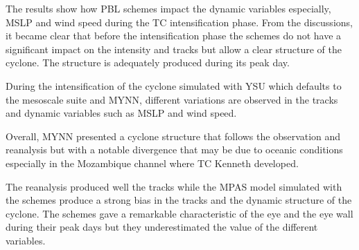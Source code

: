 \documentclass[8pt,a4paper]{article}
\begin{document}
	The results show how PBL schemes impact the dynamic variables especially, MSLP and wind speed during the TC intensification phase. From the discussions, it became clear that before the intensification phase the schemes do not have a significant impact on the intensity and tracks but allow a clear structure of the cyclone. The structure is adequately produced during its peak day.
	
	During the intensification of the cyclone simulated with YSU which defaults to the mesoscale suite and MYNN, different variations are observed in the tracks and dynamic variables such as MSLP and wind speed.
	
	Overall, MYNN presented a cyclone structure that follows the observation and reanalysis but with a notable divergence that may be due to oceanic conditions especially in the Mozambique channel where TC Kenneth developed.
	
	The reanalysis produced well the tracks while the MPAS model simulated with the schemes produce a strong bias in the tracks and the dynamic structure of the cyclone. The schemes gave a remarkable characteristic of the eye and the eye wall during their peak days but they underestimated the value of the different variables. 
	
	
	\newpage 
	
	
\end{document}
